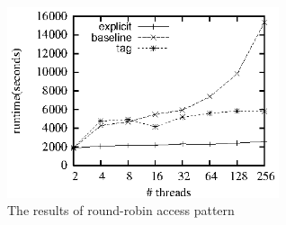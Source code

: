 \documentclass[preprint]{sigplanconf}
\begin{document}
\begin{figure}[ht!]
  \centering
  \includegraphics[width=80mm]{fig/rr.eps}
  \caption{The results of round-robin access pattern}
  \label{fig:rr_eval}
\end{figure}



%
%
\end{document}
